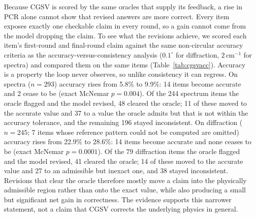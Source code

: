 \documentclass[pdflatex,sn-nature]{sn-jnl}
\newcommand{\rev}[1]{#1} %
\newcommand{\rev}[1]{{\color{blue}#1}} %
\providecommand{\DIFadd}[1]{{\protect\color{blue} \sf #1}} %
\begin{document}
\DIFadd{\rev{Because CGSV is scored by the same oracles that supply its feedback, a rise in PCR alone cannot
show that revised answers are more correct. Every item exposes exactly one checkable claim in
every round, so a gain cannot come from the model dropping the claim. To see what the revisions
achieve, we scored each item's first-round and final-round claim against the same non-circular
accuracy criteria as the accuracy-versus-consistency analysis ($0.1^\circ$ for diffraction,
$2\,\mathrm{cm}^{-1}$ for spectra) and compared them on the same items (Table~\ref{tab:cgsvacc}).
Accuracy is a property the loop never observes, so unlike consistency it can regress. On spectra
($n=293$) accuracy rises from 5.8\% to 9.9\%: 14 items become accurate and 2 cease to be (exact
McNemar $p=0.004$). Of the 244 spectrum items the oracle flagged and the model revised, 48 cleared
the oracle; 11 of these moved to the accurate value and 37 to a value the oracle admits but that
is not within the accuracy tolerance, and the remaining 196 stayed inconsistent.
On diffraction ($n=245$; 7 items whose reference pattern could not be computed are omitted) accuracy
rises from 22.9\% to 28.6\%: 14 items become accurate and none ceases to be (exact McNemar $p=0.0001$).
Of the 79 diffraction items the oracle flagged and the model revised, 41 cleared the oracle; 14 of these
moved to the accurate value and 27 to an admissible but inexact one, and 38 stayed inconsistent. Revisions that clear
the oracle therefore mostly move a claim into the physically admissible region rather than onto the
exact value, while also producing a small but significant net gain in correctness. The evidence
supports this narrower statement, not a claim that CGSV corrects the underlying physics in general.}
}
\end{document}
